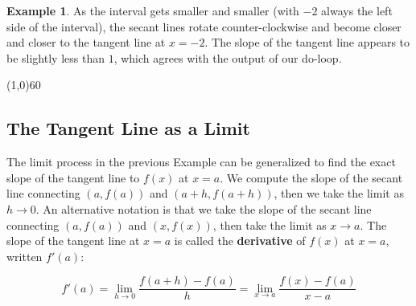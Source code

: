 \documentclass[10.5pt,twoside]{report}
\theoremstyle{definition}
\newtheorem{exmp}{Example}[section]
\begin{document}
\begin{exmp}
As the interval gets smaller and smaller (with $-2$ always the left side of the interval), the secant lines rotate counter-clockwise and become closer and closer to the tangent line at $x=-2$.  The slope of the tangent line appears to be slightly less than $1$, which agrees with the output of our do-loop.


\end{exmp}

\line(1,0){60}
\linethickness{0.5mm}

\subsection{The Tangent Line as a Limit}

The limit process in the previous Example can be generalized to find the exact slope of the tangent line to $f(x)$ at $x=a$.  We compute the slope of the secant line connecting $(a,f(a))$ and $(a+h,f(a+h))$, then we take the limit as $h \to 0$.  An alternative notation is that we take the slope of the secant line connecting $(a,f(a))$ and $(x,f(x))$, then take the limit as $x \to a$.  The slope of the tangent line at $x=a$ is called the \textbf{derivative} of $f(x)$ at $x=a$, written $f'(a)$:

\[f'(a)=\lim_{h \to 0}\frac{f(a+h)-f(a)}{h} =\lim_{x \to a}\frac{f(x)-f(a)}{x-a}\]

${}$\\
\end{document}
